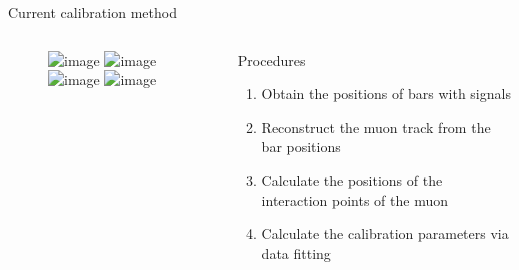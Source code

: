 \documentclass[compress, 13pt, aspectratio=169]{beamer}
\begin{document}
\begin{frame}[t]{Current calibration method}
	\vspace*{-2em}
	\begin{columns}[t]
		\begin{column}{0.45 \textwidth}
			\begin{figure}[t]
				\includegraphics<1>[width = \textwidth]{side_view1.png}
				\includegraphics<2>[width = \textwidth]{side_view2.png}
				\includegraphics<3-5>[width = \textwidth]{side_view3.png}
				\includegraphics<6>[width = \textwidth]{side_view4.png}
			\end{figure}
		\end{column}
		\begin{column}{0.45 \textwidth}
			\begin{exampleblock}{\small Procedures}
				\small
				\begin{enumerate}
					\setlength\itemsep{0em}
					\small
					\item<1-> Obtain the positions of bars with signals
					\item<2-> Reconstruct the muon track from the bar positions
					\item<3-> Calculate the positions of the interaction points of the muon
					\item<4-> Calculate the calibration parameters via data fitting
				\end{enumerate}
			\end{exampleblock}
		\end{column}
	\end{columns}
\end{frame}
\end{document}
